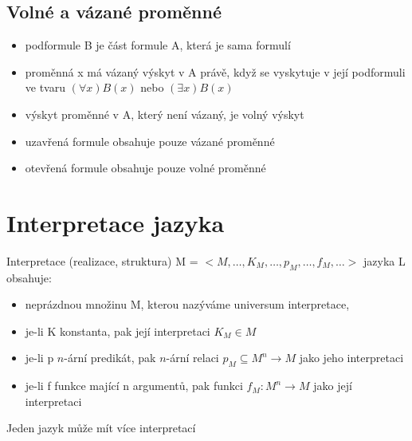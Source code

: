 \documentclass{szzclass}
\begin{document}
\subsection{Volné a vázané proměnné}
\begin{itemize}
  \item podformule B je část formule A, která je sama formulí
  \item proměnná x má vázaný výskyt v A právě, když se vyskytuje v její podformuli ve tvaru $(\forall{x})B(x)$ nebo $(\exists{x})B(x)$
  \item výskyt proměnné v A, který není vázaný, je volný výskyt
\end{itemize}
\begin{itemize}
  \item uzavřená formule obsahuje pouze vázané proměnné
  \item otevřená formule obsahuje pouze volné proměnné
\end{itemize}
\section{Interpretace jazyka}
Interpretace (realizace, struktura) M = $<M,\dots,K_M,\dots,p_M,\dots,f_M,\dots>$ jazyka L obsahuje:
\begin{itemize}
  \item neprázdnou množinu M, kterou nazýváme universum interpretace,
  \item je-li K konstanta, pak její interpretaci $K_M \in M$
  \item je-li p $n$-ární predikát, pak $n$-ární relaci $p_M \subseteq M^n \rightarrow M$ jako jeho interpretaci
  \item je-li f funkce mající n argumentů, pak funkci $f_M: M^n \rightarrow M$ jako její interpretaci
\end{itemize}
Jeden jazyk může mít více interpretací
\end{document}

